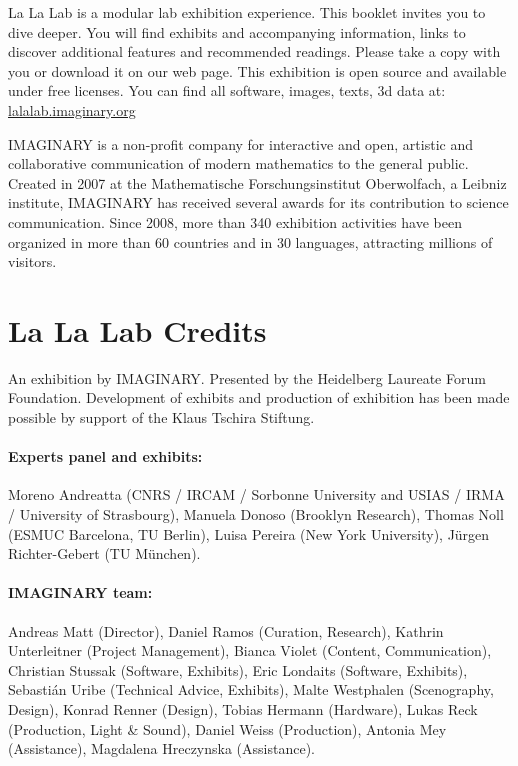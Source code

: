 La La Lab is a modular lab exhibition experience. This booklet invites you to dive deeper. You will find exhibits and accompanying information, links to discover additional features and recommended readings. Please take a copy with you or download it on our web page. This exhibition is open source and available under free licenses. You can find all software, images, texts, 3d data at:  \url{lalalab.imaginary.org}


IMAGINARY is a non-profit company for interactive and open, artistic and collaborative communication of modern mathematics to the general public. Created in 2007 at the Mathematische Forschungsinstitut Oberwolfach, a Leibniz institute, IMAGINARY has received several awards for its contribution to science communication. Since 2008, more than 340 exhibition activities have been organized in more than 60 countries and in 30 languages, attracting millions of visitors.


\section*{La La Lab Credits}
\footnotesize
An exhibition by IMAGINARY.
Presented by the Heidelberg Laureate Forum Foundation.
Development of exhibits and production of exhibition has been made possible by support of the Klaus Tschira Stiftung.

\paragraph{Experts panel and exhibits:}
Moreno Andreatta (CNRS / IRCAM / Sorbonne University and USIAS / IRMA / University of Strasbourg), Manuela Donoso (Brooklyn Research), Thomas Noll (ESMUC Barcelona, TU Berlin), Luisa Pereira (New York University), Jürgen Richter-Gebert (TU München).

\paragraph{IMAGINARY team:}
Andreas Matt (Director), Daniel Ramos (Curation, Research), Kathrin Unterleitner (Project Management), Bianca Violet (Content, Communication), Christian Stussak (Software, Exhibits), Eric Londaits (Software, Exhibits), Sebastián Uribe (Technical Advice, Exhibits), Malte Westphalen (Scenography, Design), Konrad Renner (Design), Tobias Hermann (Hardware), Lukas Reck (Production, Light \& Sound), Daniel Weiss (Production), Antonia Mey (Assistance), Magdalena Hreczynska (Assistance).

